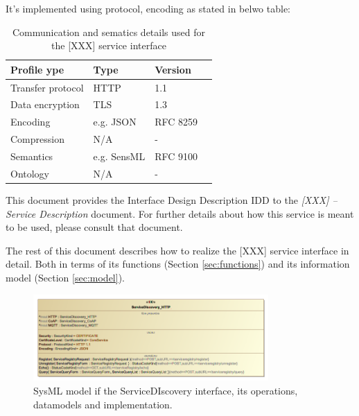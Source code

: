 \documentclass[a4paper]{arrowhead}
\begin{document}
\color{red}
It's implemented using protocol, encoding as stated in belwo table:
\begin{table}[ht!]
  \centering
  \begin{tabular}{|l|l|l|l|}
    \rowcolor{gray!33} Profile ype & Type & Version \\ \hline
    Transfer protocol & HTTP & 1.1 \\ \hline
    Data encryption & TLS & 1.3 \\ \hline
    Encoding & e.g. JSON & RFC 8259 \cite{rfc8259} \\ \hline
    Compression & N/A & - \\ \hline
    Semantics & e.g. SensML & RFC 9100 \cite{rfc9100} \\ \hline
    Ontology & N/A & - \\ \hline
  \end{tabular}
  \caption{Communication and sematics details used for the [XXX]
    service interface}
  \label{tab:comunication_semantics_profile}
\end{table}
\color{black}

This document provides the Interface Design Description IDD to the \textit{[XXX] -- Service Description} document.
For further details about how this service is meant to be used, please consult that document.

The rest of this document describes how to realize the [XXX] service
interface in detail. Both in terms of its functions (Section \ref{sec:functions}) and its information model (Section \ref{sec:model}).



\newpage

\begin{figure}[ht!]
  \centering
  \includegraphics[width=0.8\textwidth]{figures/ServiceDiscovery-IDD}
  \caption{SysML model if the ServiceDIscovery interface, its
    operations, datamodels and implementation.}
  \label{fig:ServiceDiscovery-IDD}
\end{figure}
\end{document}
